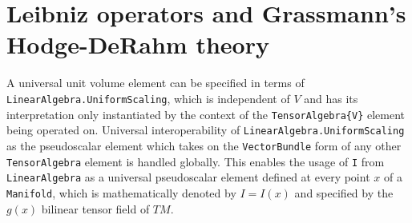 \documentclass{juliacon}
\begin{document}

\newpage

\section{Leibniz operators and Grassmann's Hodge-DeRahm theory}

A universal unit volume element can be specified in terms of \verb`LinearAlgebra.UniformScaling`, which is independent of $V$ and has its interpretation only instantiated by the context of the \verb`TensorAlgebra{V}` element being operated on.
Universal interoperability of \verb`LinearAlgebra.UniformScaling` as the pseudoscalar element which takes on the \verb`VectorBundle` form of any other \verb`TensorAlgebra` element is handled globally.
This enables the usage of \verb`I` from \verb`LinearAlgebra` as a universal pseudoscalar element defined at every point $x$ of a \verb`Manifold`, which is mathematically denoted by $I=I(x)$ and specified by the $g(x)$ bilinear tensor field of $TM$.
\end{document}
